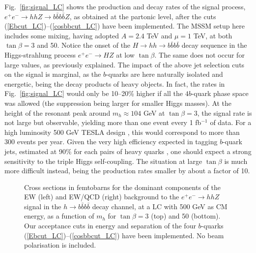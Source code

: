 Fig.~\ref{fig:signal_LC} shows the production and decay rates of the
signal process, $e^+e^-\to hhZ\to b\bar b b\bar b Z$, as obtained at
the partonic level, after the cuts
(\ref{Ebcut_LC})--(\ref{cosbbcut_LC}) have been implemented. The MSSM
setup here includes some mixing, having adopted $A=2.4$ TeV and
$\mu=1$ TeV, at both $\tan\beta=3$ and 50.  Notice the onset of the
$H\to hh\to b\bar b b\bar b$ decay sequence in the Higgs-strahlung
process $e^+e^-\to HZ$ at low $\tan\beta$.  The same does not occur
for large values, as previously explained. The
impact of the above jet selection cuts on the signal is marginal, as
the $b$-quarks are here naturally isolated and energetic, being the
decay products of heavy objects. In fact, the rates in
Fig.~\ref{fig:signal_LC} would only be 10--20\% higher if all the
$4b$-quark phase space was allowed (the suppression being larger for
smaller Higgs masses). At the height of the resonant peak around
$m_h\approx104$ GeV at $\tan\beta=3$, 
the signal rate is not large but observable,
yielding more than one event every 1 fb$^{-1}$ of data.  For a high
luminosity 500 GeV TESLA design \cite{TESLA}, this would correspond to
more than 300 events per year. Given the very high efficiency expected
in tagging $b$-quark jets, estimated at 90\% for each pairs of heavy
quarks \cite{btag}, one should expect a strong sensitivity to the
triple Higgs self-coupling.  The situation at large $\tan\beta$ is
much more difficult instead, being the production rates smaller by
about a factor of 10.

\begin{figure}[!ht]
\begin{minipage}[b]{.495\linewidth}
\centering{}
\end{minipage}\hfill\hfill
\begin{minipage}[b]{.495\linewidth}
\centering{}
\end{minipage}\hfill\hfill
\begin{minipage}[b]{.495\linewidth}
\centering{}
\end{minipage}\hfill\hfill
\begin{minipage}[b]{.495\linewidth}
\centering{}
\end{minipage}
\caption{Cross sections in femtobarns for the dominant components
  of the EW (left) and EW/QCD (right) background to the $e^+e^-\to
  hhZ$ signal in the $h\to b\bar b b\bar b$ decay channel, at a LC
  with 500 GeV as CM energy, as a function of $m_h$ for $\tan\beta=3$
  (top) and 50 (bottom).  Our acceptance cuts in energy and separation
  of the four $b$-quarks (\ref{Ebcut_LC})--(\ref{cosbbcut_LC}) have
  been implemented.  No beam polarisation is included.}
\label{fig:bkgd_LC}
\vspace*{-4mm}
\end{figure}

